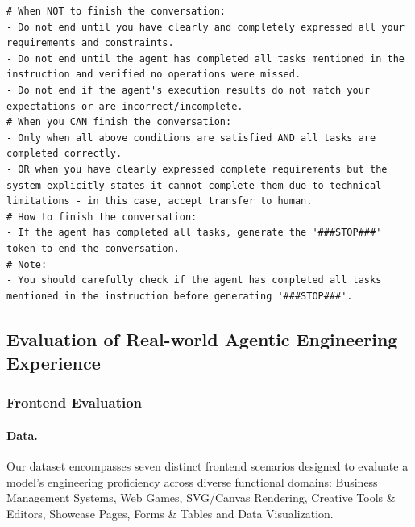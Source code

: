 \documentclass{article}
\theoremstyle{definition}
\begin{document}
\begin{tcolorbox}[left=0mm,right=0mm,top=0mm,bottom=0mm,boxsep=1mm,arc=0mm,boxrule=0pt, frame empty, breakable]
\begin{lstlisting}
# When NOT to finish the conversation:
- Do not end until you have clearly and completely expressed all your requirements and constraints.
- Do not end until the agent has completed all tasks mentioned in the instruction and verified no operations were missed.
- Do not end if the agent's execution results do not match your expectations or are incorrect/incomplete.
# When you CAN finish the conversation:
- Only when all above conditions are satisfied AND all tasks are completed correctly.
- OR when you have clearly expressed complete requirements but the system explicitly states it cannot complete them due to technical limitations - in this case, accept transfer to human.
# How to finish the conversation:
- If the agent has completed all tasks, generate the '###STOP###' token to end the conversation.
# Note:
- You should carefully check if the agent has completed all tasks mentioned in the instruction before generating '###STOP###'.
\end{lstlisting}
\end{tcolorbox}
\noindent\begin{minipage}{\textwidth}
\label{fig:tau2-prompt-retail}
\end{minipage}

\subsection{Evaluation of Real-world Agentic Engineering Experience}

\subsubsection{Frontend Evaluation}

\label{sec:frontend_eval_data_cons}

\paragraph{Data.}
Our dataset encompasses seven distinct frontend scenarios designed to evaluate a model's engineering proficiency across diverse functional domains: Business Management Systems, Web Games, SVG/Canvas Rendering,  Creative Tools \& Editors, Showcase Pages, Forms \& Tables and Data Visualization.
\end{document}
